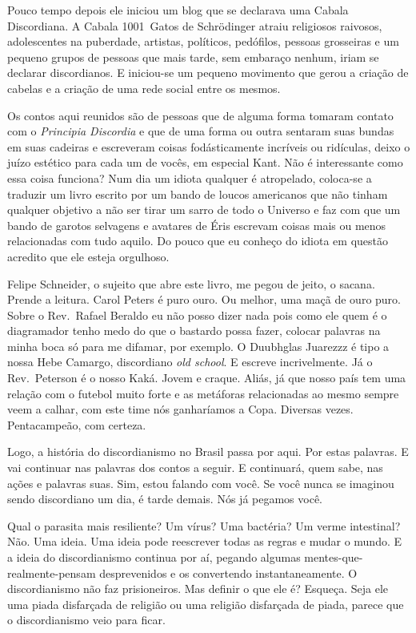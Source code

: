 Pouco tempo depois ele iniciou um blog que se declarava uma Cabala Discordiana. A Cabala 1001~Gatos de Schrödinger atraiu religiosos raivosos, adolescentes na puberdade, artistas, políticos, pedófilos, pessoas grosseiras e um pequeno grupos de pessoas que mais tarde, sem embaraço nenhum, iriam se declarar discordianos. E iniciou-se um pequeno movimento que gerou a criação de cabelas e a criação de uma rede social entre os mesmos.

Os contos aqui reunidos são de pessoas que de alguma forma tomaram contato com o \emph{Principia Discordia} e que de uma forma ou outra sentaram suas bundas em suas cadeiras e escreveram coisas fodásticamente incríveis ou ridículas, deixo o juízo estético para cada um de vocês, em especial Kant. Não é interessante como essa coisa funciona? Num dia um idiota qualquer é atropelado, coloca-se a traduzir um livro escrito por um bando de loucos americanos que não tinham qualquer objetivo a não ser tirar um sarro de todo o Universo e faz com que um bando de garotos selvagens e avatares de Éris escrevam coisas mais ou menos relacionadas com tudo aquilo. Do pouco que eu conheço do idiota em questão acredito que ele esteja orgulhoso.

Felipe Schneider, o sujeito que abre este livro, me pegou de jeito, o sacana. Prende a leitura. Carol Peters é puro ouro. Ou melhor, uma maçã de ouro puro. Sobre o Rev.~Rafael Beraldo eu não posso dizer nada pois como ele quem é o diagramador tenho medo do que o bastardo possa fazer, colocar palavras na minha boca só para me difamar, por exemplo. O Duubhglas Juarezzz é tipo a nossa Hebe Camargo, discordiano \foreignlanguage{english}{\emph{old school}}. E escreve incrivelmente. Já o Rev.~Peterson é o nosso Kaká. Jovem e craque. Aliás, já que nosso país tem uma relação com o futebol muito forte e as metáforas relacionadas ao mesmo sempre veem a calhar, com este time nós ganharíamos a Copa. Diversas vezes. Pentacampeão, com certeza.

Logo, a história do discordianismo no Brasil passa por aqui. Por estas palavras. E vai continuar nas palavras dos contos a seguir. E continuará, quem sabe, nas ações e palavras suas. Sim, estou falando com você. Se você nunca se imaginou sendo discordiano um dia, é tarde demais. Nós já pegamos você.

Qual o parasita mais resiliente? Um vírus? Uma bactéria? Um verme intestinal? Não. Uma ideia. Uma ideia pode reescrever todas as regras e mudar o mundo. E a ideia do discordianismo continua por aí, pegando algumas mentes-que-realmente-pensam desprevenidos e os convertendo instantaneamente. O discordianismo não faz prisioneiros. Mas definir o que ele é? Esqueça. Seja ele uma piada disfarçada de religião ou uma religião disfarçada de piada, parece que o discordianismo veio para ficar.

